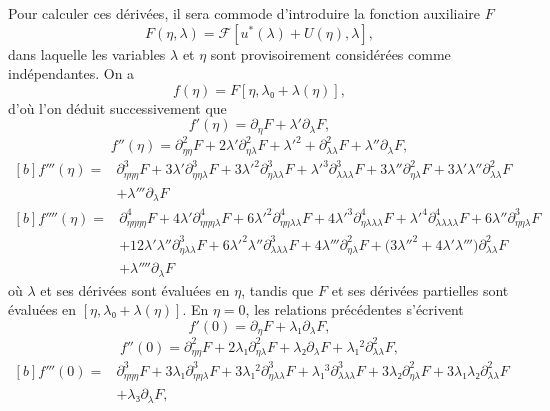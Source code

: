 \documentclass[12pt, final]{amsart}
\theoremstyle{definition}
\begin{document}
Pour calculer ces dérivées, il sera commode d'introduire la fonction auxiliaire
\(F\)
\begin{equation}
  F(η, λ) =\mathcal{F}[u^{\ast}(λ) + U(η), λ],
\end{equation}
dans laquelle les variables \(λ\) et \(η\) sont provisoirement considérées comme
indépendantes. On a
\begin{equation}
 f(η) = F[η, λ₀ + λ(η)],
\end{equation}
d'où l'on déduit successivement que
\begin{equation}
  \label{eq:20211112162417}
  f'(η) = ∂_{η} F + λ' ∂_{λ} F,
\end{equation}
\begin{equation}
  \label{eq:20211112165810}
  f''(η) = ∂_{ηη}^2 F + 2λ' ∂_{ηλ}^2 {F + λ'}^2 + ∂_{λλ}^2 F + λ'' ∂_{λ} F,
\end{equation}
\begin{equation*}
  \begin{aligned}[b]
    \label{eq:20211112173223}
    f'''(η) ={}
    & ∂_{ηηη}^3 F + 3 λ' ∂_{ηηλ}^3 {F + 3 λ'}^2 ∂_{ηλλ}^3 {F + λ'}^3 ∂_{λλλ}^3 F + 3 λ'' ∂_{ηλ}^2 F + 3 λ' λ'' ∂_{λ λ}^2 F\\
    & + λ''' ∂_{λ} F
  \end{aligned}
\end{equation*}
\begin{equation}
  \begin{aligned}[b]
    f''''(η) ={}
    & ∂_{ηηηη}^4 F + 4 λ' ∂_{ηηηλ}^4 {F + 6 λ'}^2 ∂_{ηηλλ}^4 {F + 4 λ'}^3 ∂_{ηλλλ}^4 {F + λ'}^4 ∂_{λλλλ}^4 F + 6 λ'' ∂_{ηηλ}^3 F\\
    & + 12 λ' λ'' ∂_{ηλλ}^3 {F + 6 λ'}^2 λ'' ∂_{λλλ}^3 F + 4 λ''' ∂_{ηλ}^2 F + \bigl( {3 λ''}^2 + 4 λ' λ''' \bigr) ∂_{λλ}^2 F\\
    & + λ'''' ∂_{λ}F
  \end{aligned}
\end{equation}
où \(λ\) et ses dérivées sont évaluées en \(η\), tandis que \(F\) et ses
dérivées partielles sont évaluées en \([η, λ₀ + λ(η)]\). En \(η = 0\), les
relations précédentes s'écrivent
\begin{equation}
  \label{eq:20220107060454}
  f'(0) = ∂_{η} F + λ₁ ∂_{λ} F,
\end{equation}
\begin{equation}
  \label{eq:20220107124311}
  f''(0) = ∂_{ηη}^2 F + 2 λ₁ ∂_{ηλ}^2 F + λ₂ ∂_{λ} F + λ₁^2 ∂_{λλ}^2 F,
\end{equation}
\begin{equation}
  \label{eq:20220107060500}
  \begin{aligned}[b]
    f'''(0) ={}
    & ∂_{ηηη}^3 F + 3 λ₁ ∂_{ηηλ}^3 F + 3 λ₁^2 ∂_{ηλλ}^3 F + λ₁^3 ∂_{λλλ}^3 F + 3 λ₂ ∂_{ηλ}^2 F + 3 λ₁ λ₂ ∂_{λλ}^2 F\\
    & + λ₃ ∂_{λ} F,
  \end{aligned}
\end{equation}
\end{document}
